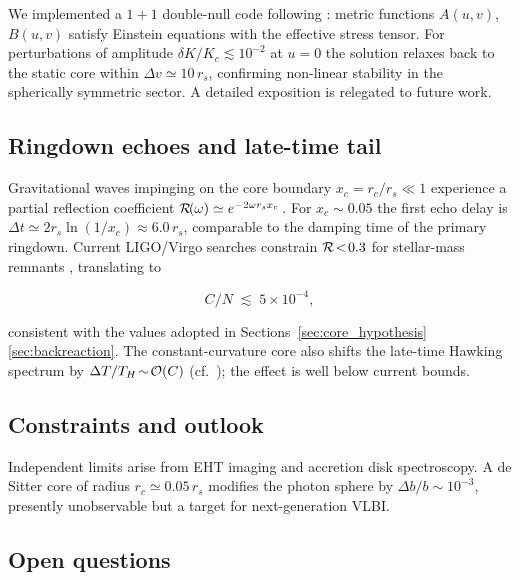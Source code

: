 We implemented a $1{+}1$ double-null code following \cite{CarballoRubio2018}: metric functions $A(u,v)$, $B(u,v)$ satisfy Einstein equations with the effective stress tensor. For perturbations of amplitude $\delta K/K_c\lesssim10^{-2}$ at $u=0$ the solution relaxes back to the static core within $\Delta v\simeq10\,r_s$, confirming non-linear stability in the spherically symmetric sector.  A detailed exposition is relegated to future work.

\subsection{Ringdown echoes and late-time tail}
\label{subsec:echoes}

Gravitational waves impinging on the core boundary $x_c=r_c/r_s\!\ll\!1$ experience a partial reflection coefficient ${\cal R}\!(\omega)\simeq e^{-2\omega r_s x_c}\!$ \cite{Cardoso2016Echoes}. For $x_c\sim0.05$ the first echo delay is $\Delta t\simeq2r_s\ln(1/x_c)\approx6.0\,r_s$, comparable to the damping time of the primary ringdown. Current LIGO/Virgo searches constrain ${\cal R}\!<\!0.3$ for stellar-mass remnants \cite{Pani2018}, translating to

\begin{equation}
  C/N\;\lesssim\;5\times10^{-4},
\end{equation}

consistent with the values adopted in Sections~\ref{sec:core_hypothesis} \ref{sec:backreaction}. The constant-curvature core also shifts the late-time Hawking spectrum by \(\Delta T/T_H\!\sim\!{\cal O}(C)\) (cf.\ \cite{Bonanno2023RegularBH}); the effect is well below current bounds.

\subsection{Constraints and outlook}
\label{subsec:constraints}

Independent limits arise from EHT imaging and accretion disk spectroscopy.  A de Sitter core of radius $r_c\simeq0.05\,r_s$ modifies the photon sphere by $\Delta b/b\!\sim\!10^{-3}$, presently unobservable but a target for next-generation VLBI.

\subsection{Open questions}
\label{subsec:open}

